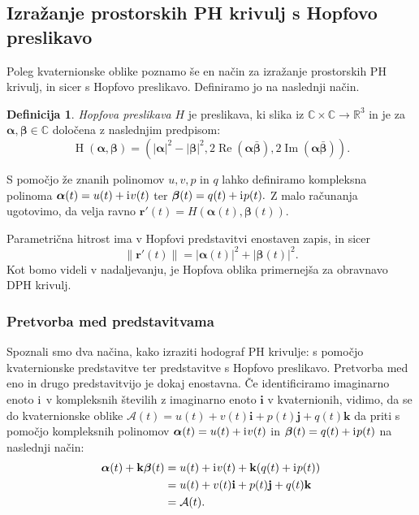 \documentclass[12pt,a4paper,twoside]{article}
\newcommand{\iu}{\mathrm{i}\mkern1mu} %
\theoremstyle{definition} %
\newtheorem{definicija}{Definicija}[section]
\theoremstyle{plain} %
\theoremstyle{primerstyle}
\numberwithin{equation}{section}  %
\newcommand{\R}{\mathbb R}
\renewcommand{\C}{\mathbb C}
\newcommand{\rV}{\mathbf{r}}
\newcommand{\iV}{\mathbf{i}}
\newcommand{\jV}{\mathbf{j}}
\newcommand{\kV}{\mathbf{k}}
\newcommand{\AQ}{\mathcal{A}}
\newcommand{\balpha}{\boldsymbol \alpha}
\newcommand{\bbeta}{\boldsymbol \beta}
\DeclareMathOperator{\hopf}{H}
\DeclareMathOperator{\ReC}{Re}
\DeclareMathOperator{\ImC}{Im}
\begin{document}
\subsection{Izražanje prostorskih PH krivulj s Hopfovo preslikavo}
\label{hopf_poglavje}

Poleg kvaternionske oblike poznamo še en način za izražanje prostorskih PH krivulj, in sicer s Hopfovo preslikavo. Definiramo jo na naslednji način.
\begin{definicija}
	\label{hopf_def}
	\emph{Hopfova preslikava} $H$ je preslikava, ki slika iz $\C \times \C \to \R^3$ in je za $\balpha, \bbeta \in \C$ določena z naslednjim predpisom:
	\begin{equation}
		\label{hopf}
		\hopf(\balpha, \bbeta)=(|\balpha|^2-|\bbeta|^2,2\ReC(\balpha \bar{\bbeta}),2\ImC(\balpha \bar{\bbeta})).
	\end{equation}
\end{definicija}
S pomočjo že znanih polinomov $u,v,p$ in $q$ lahko definiramo kompleksna polinoma $\balpha(t)=u(t)+\iu v(t)$ ter $\bbeta(t)=q(t)+\iu p(t).$ Z malo računanja ugotovimo, da velja ravno $\rV'(t)=H(\balpha(t),\bbeta(t)).$

Parametrična hitrost ima v Hopfovi predstavitvi enostaven zapis, in sicer $$\lVert \rV'(t) \rVert=|\balpha(t)|^2+|\bbeta(t)|^2.$$ Kot bomo videli v nadaljevanju, je Hopfova oblika primernejša za obravnavo DPH krivulj.

\subsubsection{Pretvorba med predstavitvama}

Spoznali smo dva načina, kako izraziti hodograf PH krivulje: s pomočjo kvaternionske predstavitve ter predstavitve s Hopfovo preslikavo. Pretvorba med eno in drugo predstavitvijo je dokaj enostavna. Če identificiramo imaginarno enoto $\iu$ v kompleksnih številih z imaginarno enoto $\iV$ v kvaternionih, vidimo, da se do kvaternionske oblike $\AQ(t)=u(t)+v(t)\iV+p(t)\jV+q(t)\kV$ da priti s pomočjo kompleksnih polinomov $\balpha(t)=u(t)+\iu v(t)$ in $\bbeta(t)=q(t)+\iu p(t)$ na naslednji način:
\begin{align}
	\balpha(t)+\kV\bbeta(t) &= u(t)+\iu v(t)+\kV(q(t)+ \iu p(t)) \nonumber \\
	&=u(t)+v(t)\iV + p(t)\jV+ q(t)\kV \label{comp_to_quat} \\
	&= \AQ(t).\nonumber
\end{align}
\end{document}
